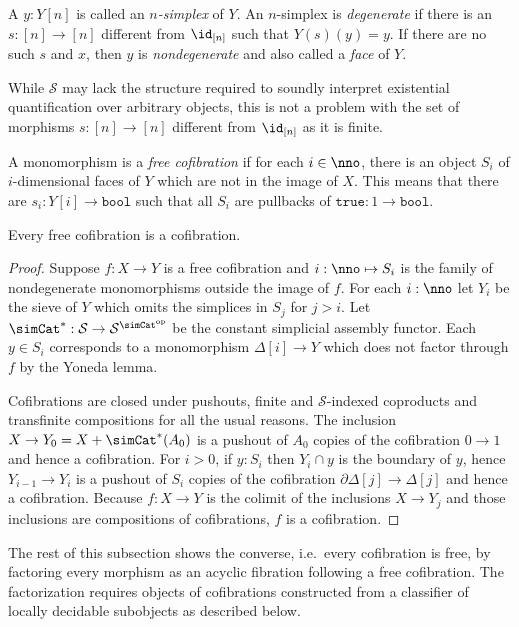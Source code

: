 \documentclass{tac}
\newcommand\cat\mathcal
\newcommand\ri{^*}
\newcommand\dual{^{\mathrm{op}}}
\newcommand\s{^{\simCat\dual}}
\newcommand\of{:}
\newcommand\simplex\Delta
\newcommand\cycle{\partial\Delta}
\newcommand\true{\mathtt{true}}
\newcommand\bool{\mathtt{bool}}
\begin{document}
\begin{definition} A $y\of Y[n]$ is called an \emph{$n$-simplex} of $Y$. An $n$-simplex is \emph{degenerate} if there is an $s\of [n]\to [n]$ different from $\id_{[n]}$ such that $Y(s)(y)=y$. If there are no such $s$ and $x$, then $y$ is \emph{nondegenerate} and also called a \emph{face} of $Y$.\end{definition}

While $\cat S$ may lack the structure required to soundly interpret existential quantification over arbitrary objects, this is not a problem with the set of morphisms $s\of [n]\to [n]$ different from $\id_{[n]}$ as it is finite.

\begin{definition} A monomorphism is a \emph{free cofibration} if for each $i\in \nno$, there is an object $S_i$ of $i$-dimensional faces of $Y$ which are not in the image of $X$. This means that there are $s_i:Y[i]\to\bool$ such that all $S_i$ are pullbacks of $\true:1\to\bool$.
\end{definition}

\begin{lemma} Every free cofibration is a cofibration. \label{Reedy}
\end{lemma}

\begin{proof} Suppose $f\of X\to Y$ is a free cofibration and $i\of\nno\mapsto S_i$ is the family of nondegenerate monomorphisms outside the image of $f$. 
For each $i\of\nno$ let $Y_i$ be the sieve of $Y$ which omits the simplices in $S_j$ for $j>i$.
Let $\simCat\ri\of \cat S\to\cat S\s$ be the constant simplicial assembly functor. 
Each $y\in S_i$ corresponds to a monomorphism $\simplex[i]\to Y$ which does not factor through $f$ by the Yoneda lemma.

Cofibrations are closed under pushouts, finite and $\cat S$-indexed coproducts and transfinite compositions for all the usual reasons.
The inclusion $X\to Y_0 = X+\simCat\ri(A_0)$ is a pushout of $A_0$ copies of the cofibration $0\to 1$ and hence a cofibration.
For $i>0$, if $y\of S_i$ then $Y_i\cap y$ is the boundary of $y$, hence $Y_{i-1}\to Y_i$ is a pushout of $S_i$ copies of the cofibration $\cycle[j]\to\simplex[j]$ and hence a cofibration. Because $f\of X\to Y$ is the colimit of the inclusions $X\to Y_j$ and those inclusions are compositions of cofibrations, $f$ is a cofibration.
\end{proof}

The rest of this subsection shows the converse, i.e.\ every cofibration is free, by factoring every morphism as an acyclic fibration following a free cofibration. The factorization requires objects of cofibrations constructed from a classifier of locally decidable subobjects as described below.
\end{document}
